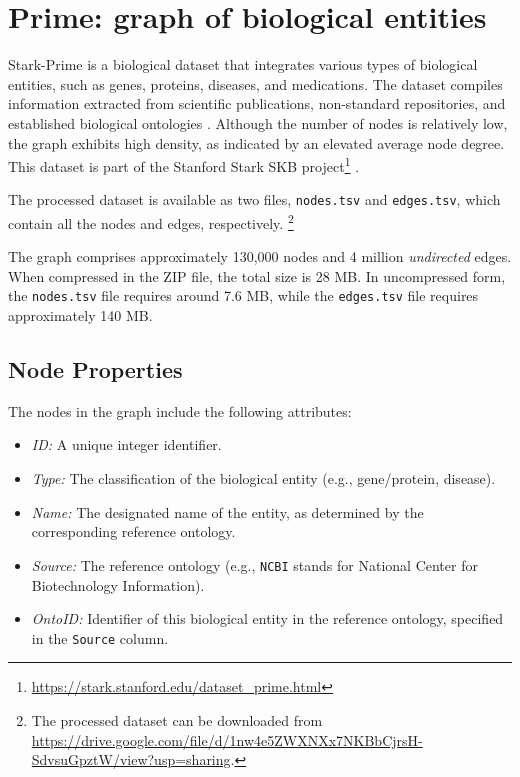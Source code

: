 \section{Prime: graph of biological entities}
\label{sec:prime-kg}

Stark-Prime is a biological dataset that integrates various types of biological entities, such as genes, proteins, diseases, and medications. The dataset compiles information extracted from scientific publications, non-standard repositories, and established biological ontologies \cite{chandak2023building}. Although the number of nodes is relatively low, the graph exhibits high density, as indicated by an elevated average node degree. This dataset is part of the Stanford Stark SKB project\footnote{\url{https://stark.stanford.edu/dataset_prime.html}} \cite{stark2024}.

The processed dataset is available as two files, \texttt{nodes.tsv} and \texttt{edges.tsv}, which contain all the nodes and edges, respectively. \footnote{The processed dataset can be downloaded from \url{https://drive.google.com/file/d/1nw4e5ZWXNXx7NKBbCjrsH-SdvsuGpztW/view?usp=sharing}.}

The graph comprises approximately 130,000 nodes and 4 million \emph{undirected} edges. When compressed in the ZIP file, the total size is 28 MB. In uncompressed form, the \texttt{nodes.tsv} file requires around 7.6 MB, while the \texttt{edges.tsv} file requires approximately 140 MB.

\subsection*{Node Properties}
The nodes in the graph include the following attributes:
\begin{itemize}
    \item \emph{ID:} A unique integer identifier.
    \item \emph{Type:} The classification of the biological entity (e.g., gene/protein, disease).
    \item \emph{Name:} The designated name of the entity, as determined by the corresponding reference ontology.
    \item \emph{Source:} The reference ontology (e.g., \texttt{NCBI} stands for National Center for Biotechnology Information).
    \item \emph{OntoID:} Identifier of this biological entity in the reference ontology, specified in the
\texttt{Source} column.
\end{itemize}

